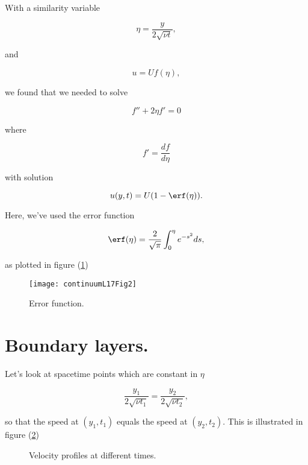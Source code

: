 With a similarity variable

\begin{equation}\label{eqn:continuumL17:60}
\eta = \frac{y}{2 \sqrt{\nu t}},
\end{equation}

and 

\begin{equation}\label{eqn:continuumL17:80}
u = U f(\eta),
\end{equation}

we found that we needed to solve

\begin{equation}\label{eqn:continuumL17:100}
f'' + 2 \eta f' = 0
\end{equation}

where 

\begin{equation}\label{eqn:continuumL17:120}
f' = \frac{df}{d\eta}
\end{equation}

with solution

\begin{equation}\label{eqn:continuumL17:140}
u(y, t) = U(1 - \erf(\eta)).
\end{equation}

Here, we've used the error function

\begin{equation}\label{eqn:continuumL17:160}
\erf(\eta) = \frac{2}{\sqrt{\pi}} \int_0^\eta e^{-s^2} ds,
\end{equation}

as plotted in figure (\ref{fig:continuumL17:continuumL17Fig2})
\begin{figure}[htp]
   \centering
   \texttt{[image: continuumL17Fig2]}
   \caption{Error function.}\label{fig:continuumL17:continuumL17Fig2}
\end{figure}

\section{Boundary layers.}

Let's look at spacetime points which are constant in $\eta$

\begin{equation}\label{eqn:continuumL17:180}
\frac{y_1}{2 \sqrt{\nu t_1}} = \frac{y_2}{2 \sqrt{\nu t_2}},
\end{equation}

so that the speed at $(y_1, t_1)$ equals the speed at $(y_2, t_2)$.  This is illustrated in figure (\ref{fig:continuumL17:continuumL17Fig3})
\begin{figure}[htp]
   \centering
   \def\svgwidth{0.6\columnwidth}
   
   \caption{Velocity profiles at different times.}\label{fig:continuumL17:continuumL17Fig3}
\end{figure}

